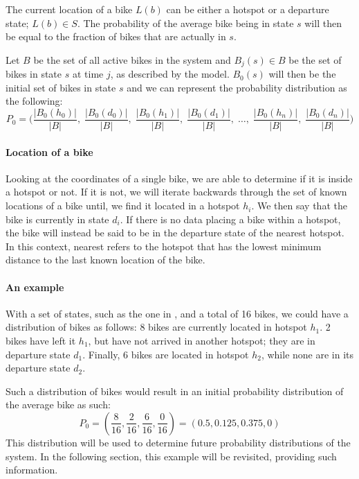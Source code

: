The current location of a bike $L(b)$ can be either a hotspot or a departure state; $L(b) \in S$.
The probability of the average bike being in state $s$ will then be equal to the fraction of bikes that are actually in $s$.

Let $B$ be the set of all active bikes in the system and $B_j(s) \in B$ be the set of bikes in state $s$ at time $j$, as described by the model.
$B_0(s)$ will then be the initial set of bikes in state $s$ and we can represent the probability distribution as the following:
\begin{equation}\label{markov:vector:init}
P_0 = \Bigg(
\frac{\lvert B_0(h_0) \rvert}{\lvert B \rvert},\;
\frac{\lvert B_0(d_0) \rvert}{\lvert B \rvert},\;
\frac{\lvert B_0(h_1) \rvert}{\lvert B \rvert},\;
\frac{\lvert B_0(d_1) \rvert}{\lvert B \rvert},\;
\dots,\;
\frac{\lvert B_0(h_n) \rvert}{\lvert B \rvert},\;
\frac{\lvert B_0(d_n) \rvert}{\lvert B \rvert}
\Bigg)
\end{equation}

\paragraph{Location of a bike}
Looking at the coordinates of a single bike, we are able to determine if it is inside a hotspot or not.
If it is not, we will iterate backwards through the set of known locations of a bike until, we find it located in a hotspot $h_i$.
We then say that the bike is currently in state $d_i$.
If there is no data placing a bike within a hotspot, the bike will instead be said to be in the departure state of the nearest hotspot.
In this context, nearest refers to the hotspot that has the lowest minimum distance to the last known location of the bike.

\paragraph{An example}
With a set of states, such as the one in , and a total of 16 bikes, we could have a distribution of bikes as follows:
8 bikes are currently located in hotspot $h_1$. 2 bikes have left it $h_1$, but have not arrived in another hotspot; they are in departure state $d_1$.
Finally, 6 bikes are located in hotspot $h_2$, while none are in its departure state $d_2$.

Such a distribution of bikes would result in an initial probability distribution of the average bike as such:
$$P_0 = \left(\frac{8}{16}, \frac{2}{16}, \frac{6}{16}, \frac{0}{16}\right)=(0.5, 0.125, 0.375, 0)$$\label{markov:example-vector}
This distribution will be used to determine future probability distributions of the system.
In the following section, this example will be revisited, providing such information.

